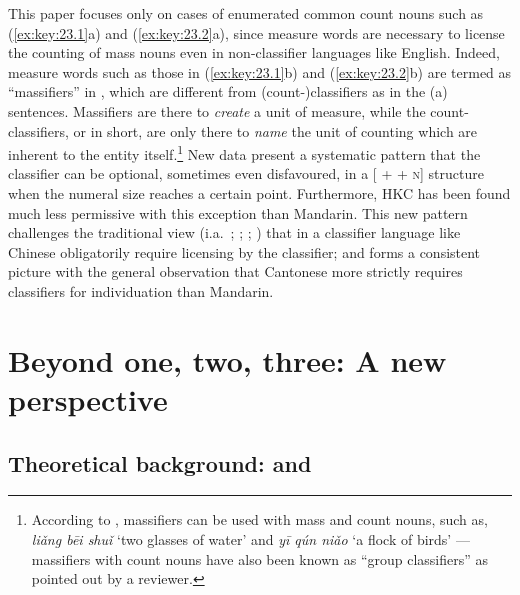 \documentclass[output=paper]{langsci/langscibook}
\begin{document}
This paper focuses only on cases of enumerated common count nouns such as
(\ref{ex:key:23.1}a) and (\ref{ex:key:23.2}a), since measure words are
necessary to license the counting of mass nouns even in non-classifier
languages like English. Indeed, measure words such as those in
(\ref{ex:key:23.1}b) and (\ref{ex:key:23.2}b) are termed as
\enquote{massifiers} in \citet{ChengSybesma1998}, which are different from
(count-)classifiers as in the (a) sentences.  Massifiers are there to
\emph{create} a unit of measure, while the count-classifiers, or
 in short, are only there to \emph{name} the unit of counting
which are inherent to the entity itself.\footnote{According to
    \textcite{ChengSybesma1998}, massifiers can be used with mass and count
    nouns, such as, \emph{liǎng bēi shuǐ} \enquote*{two glasses of water} and
    \emph{yī qún niǎo} \enquote*{a flock of birds} --- massifiers with count
nouns have also been known as \enquote{group classifiers} as pointed out by a
reviewer.} New data present a systematic pattern that the
classifier can be optional, sometimes even disfavoured, in a
[\Num{} + \Clf{} + \textsc{n}] structure when the numeral size
reaches a certain point. Furthermore, \gls{HKC} has
been found much less permissive with this exception than Mandarin.
This new pattern challenges the traditional view (i.a.~\citealt{Krifka1995};
\citealt{Chierchia1998};
\citealt{ChengSybesma1999,ChengSybesma2005,ChengSybesma2012};
\citealt{Doetjes1996}) that  in a classifier
language like Chinese obligatorily require licensing by the
classifier; and forms a consistent picture with the general
observation that Cantonese more strictly requires classifiers for individuation
than Mandarin.

\section{Beyond one, two, three: A new perspective}

\subsection{Theoretical background: \citet{Krifka1995} and \citet{Chierchia1998}}
\end{document}
